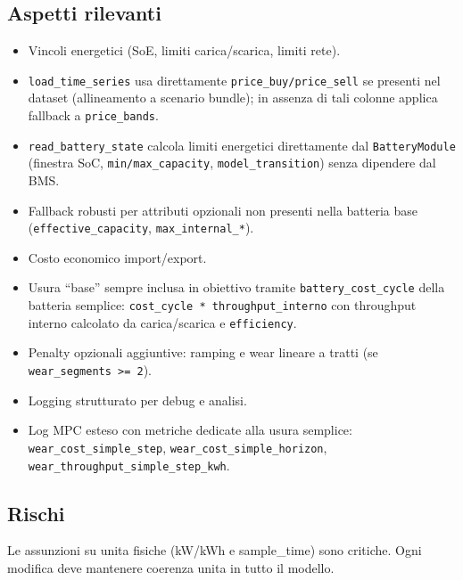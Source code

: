 \subsection*{Aspetti rilevanti}
\begin{itemize}[leftmargin=1.2cm]
\item Vincoli energetici (SoE, limiti carica/scarica, limiti rete).
\item \texttt{load\_time\_series} usa direttamente \texttt{price\_buy/price\_sell} se presenti nel dataset
(allineamento a scenario bundle); in assenza di tali colonne applica fallback a \texttt{price\_bands}.
\item \texttt{read\_battery\_state} calcola limiti energetici direttamente dal \texttt{BatteryModule} (finestra SoC, \texttt{min/max\_capacity}, \texttt{model\_transition}) senza dipendere dal BMS.
\item Fallback robusti per attributi opzionali non presenti nella batteria base (\texttt{effective\_capacity}, \texttt{max\_internal\_*}).
\item Costo economico import/export.
\item Usura ``base'' sempre inclusa in obiettivo tramite \texttt{battery\_cost\_cycle} della batteria semplice:
\texttt{cost\_cycle * throughput\_interno} con throughput interno calcolato da carica/scarica e \texttt{efficiency}.
\item Penalty opzionali aggiuntive: ramping e wear lineare a tratti (se \texttt{wear\_segments >= 2}).
\item Logging strutturato per debug e analisi.
\item Log MPC esteso con metriche dedicate alla usura semplice:
\texttt{wear\_cost\_simple\_step}, \texttt{wear\_cost\_simple\_horizon},
\texttt{wear\_throughput\_simple\_step\_kwh}.
\end{itemize}

\subsection*{Rischi}
Le assunzioni su unita fisiche (kW/kWh e sample\_time) sono critiche. Ogni modifica deve mantenere coerenza unita in tutto il modello.
